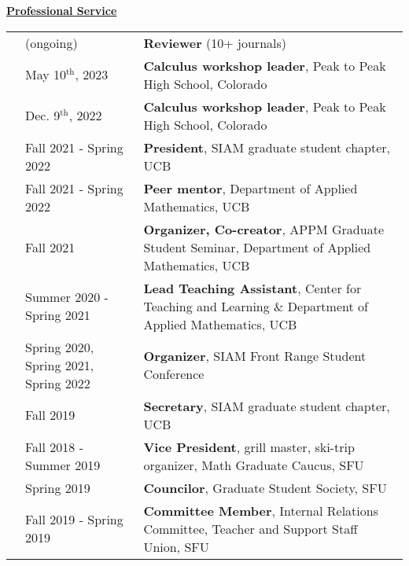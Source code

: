 \documentclass[letterpaper,11pt,oneside]{article}
\newcommand{\headr}[1]{\uline{\Large{\textbf{#1}} \hfill } \\ \vspace{-0.5cm}}
\begin{document}
\headr{Professional Service}
\begin{tabular}{p{0.01cm} p{4.5cm} p{12cm}}
& (ongoing) & {\bf Reviewer} (10+ journals)\\
& May 10$^\text{th}$, 2023 & {\bf Calculus workshop leader}, Peak to Peak High School, Colorado \\ 
& Dec. 9$^\text{th}$, 2022 & {\bf Calculus workshop leader}, Peak to Peak High School, Colorado \\ 
& Fall 2021 - Spring 2022 & \textbf{President}, SIAM graduate student chapter, UCB\\
& Fall 2021 - Spring 2022  & \textbf{Peer mentor}, Department of Applied Mathematics, UCB\\
& Fall 2021  & \textbf{Organizer, Co-creator}, APPM Graduate Student Seminar, Department of Applied Mathematics, UCB\\
& Summer 2020 - Spring 2021 & \textbf{Lead Teaching Assistant}, Center for Teaching and Learning \& Department of Applied Mathematics, UCB\\
& Spring 2020, Spring 2021, Spring 2022  & \textbf{Organizer}, SIAM Front Range Student Conference \\
& Fall 2019  & \textbf{Secretary}, SIAM graduate student chapter, UCB\\
& Fall 2018 - Summer 2019 & \textbf{Vice President}, grill master, ski-trip organizer, Math Graduate Caucus, SFU\\
& Spring 2019 & \textbf{Councilor}, Graduate Student Society, SFU\\
& Fall 2019 - Spring 2019 & \textbf{Committee Member}, Internal Relations Committee, Teacher and Support Staff Union, SFU \\
\end{tabular}






\end{document}
